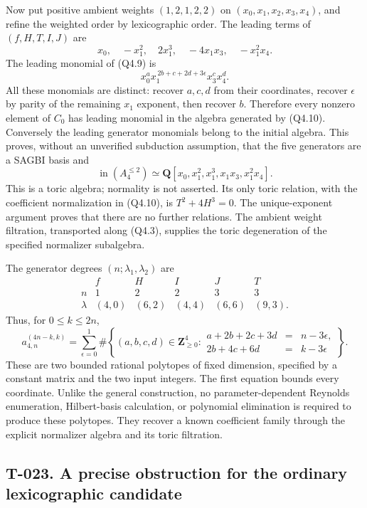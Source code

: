 \documentclass[
  10pt,
]{article}
\begin{document}
Now put positive ambient weights \((1,2,1,2,2)\) on
\((x_0,x_1,x_2,x_3,x_4)\), and refine the weighted order by
lexicographic order. The leading terms of \((f,H,T,I,J)\) are \[
x_0,\quad -x_1^2,\quad 2x_1^3,\quad -4x_1x_3,\quad -x_1^2x_4.
\tag{Q4.10}
\] The leading monomial of (Q4.9) is \[
x_0^a x_1^{\,2b+c+2d+3\epsilon}x_3^cx_4^d.
\] All these monomials are distinct: recover \(a,c,d\) from their
coordinates, recover \(\epsilon\) by parity of the remaining \(x_1\)
exponent, then recover \(b\). Therefore every nonzero element of \(C_0\)
has leading monomial in the algebra generated by (Q4.10). Conversely the
leading generator monomials belong to the initial algebra. This proves,
without an unverified subduction assumption, that the five generators
are a SAGBI basis and \[
\boxed{\operatorname{in}(A_4^{\le2})
\simeq\mathbf Q[x_0,x_1^2,x_1^3,x_1x_3,x_1^2x_4].}
\tag{Q4.11}
\] This is a toric algebra; normality is not asserted. Its only toric
relation, with the coefficient normalization in (Q4.10), is
\(T^2+4H^3=0\). The unique-exponent argument proves that there are no
further relations. The ambient weight filtration, transported along
(Q4.3), supplies the toric degeneration of the specified normalizer
subalgebra.

The generator degrees \((n;\lambda_1,\lambda_2)\) are \[
\begin{array}{c|ccccc}
 &f&H&I&J&T\\ \hline
n&1&2&2&3&3\\
\lambda&(4,0)&(6,2)&(4,4)&(6,6)&(9,3).
\end{array}
\] Thus, for \(0\le k\le2n\), \[
\boxed{
a_{4,n}^{(4n-k,k)}
=\sum_{\epsilon=0}^{1}
\#\left\{(a,b,c,d)\in\mathbf Z_{\ge0}^{4}:
\begin{array}{rcl}
a+2b+2c+3d&=&n-3\epsilon,\\
2b+4c+6d&=&k-3\epsilon
\end{array}\right\}.
}
\tag{Q4.12}
\] These are two bounded rational polytopes of fixed dimension,
specified by a constant matrix and the two input integers. The first
equation bounds every coordinate. Unlike the general construction, no
parameter-dependent Reynolds enumeration, Hilbert-basis calculation, or
polynomial elimination is required to produce these polytopes. They
recover a known coefficient family through the explicit normalizer
algebra and its toric filtration.

\subsection{T-023. A precise obstruction for the ordinary lexicographic
candidate}\label{t-023.-a-precise-obstruction-for-the-ordinary-lexicographic-candidate}
\end{document}
